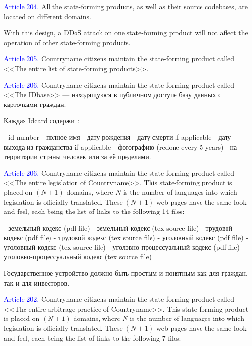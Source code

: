 \documentclass[11pt]{article}
\theoremstyle{remark}
\theoremstyle{definition}
\begin{document}
\color{black}

\textcolor{blue}{Article 204.} All the state-forming products, as well as their source codebases, are located on different domains. 

\color{blue}

With this design, a DDoS attack on one state-forming product will not affect the operation of other state-forming products.

\color{black}

\textcolor{blue}{Article 205.} Countryname citizens maintain the state-forming product called <<The entire list of state-forming products>>.

\textcolor{blue}{Article 206.} Countryname citizens maintain the state-forming product called <<The IDbase>> --- находящуюся в публичном доступе базу данных с карточками граждан.

Каждая Idcard содержит:

- id number 
- полное имя
- дату рождения
- дату смерти if applicable
- дату выхода из гражданства if applicable
- фотографию (redone every 5 years)
- на территории страны человек или за её пределами.






\textcolor{blue}{Article 206.} Countryname citizens maintain the state-forming product called <<The entire legislation of Countryname>>. This state-forming product is placed on $(N+1)$ domains, where $N$ is the number of languages into which legislation is officially translated. These $(N+1)$ web pages have the same look and feel, each being the list of links to the following 14 files:

- земельный кодекс (pdf file)
- земельный кодекс (tex source file)
- трудовой кодекс (pdf file)
- трудовой кодекс (tex source file)
- уголовный кодекс (pdf file)
- уголовный кодекс (tex source file)
- уголовно-процессуальный кодекс (pdf file)
- уголовно-процессуальный кодекс (tex source file)

\color{blue}

Государственное устройство должно быть простым и понятным как для граждан, так и для инвесторов.

\color{black}

\textcolor{blue}{Article 202.} Countryname citizens maintain the state-forming product called <<The entire arbitrage practice of Countryname>>. This state-forming product is placed on $(N+1)$ domains, where $N$ is the number of languages into which legislation is officially translated. These $(N+1)$ web pages have the same look and feel, each being the list of links to the following 7 files:
\end{document}
